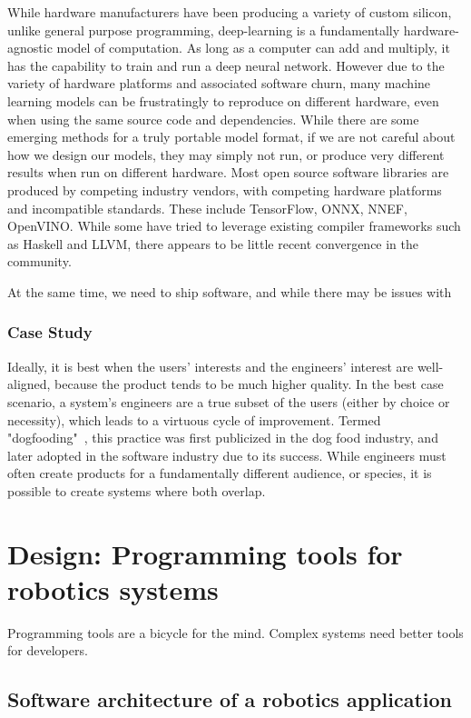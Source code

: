 \documentclass[12pt,initial,twoside,maitrise]{dms}
\numberwithin{equation}{section}
\numberwithin{table}{chapter}
\numberwithin{figure}{chapter}
\begin{document}
While hardware manufacturers have been producing a variety of custom silicon, unlike general purpose programming, deep-learning is a fundamentally hardware-agnostic model of computation. As long as a computer can add and multiply, it has the capability to train and run a deep neural network. However due to the variety of hardware platforms and associated software churn, many machine learning models can be frustratingly to reproduce on different hardware, even when using the same source code and dependencies. While there are some emerging methods for a truly portable model format, if we are not careful about how we design our models, they may simply not run, or produce very different results when run on different hardware. Most open source software libraries are produced by competing industry vendors, with competing hardware platforms and incompatible standards. These include TensorFlow, ONNX, NNEF, OpenVINO. While some have tried to leverage existing compiler frameworks such as Haskell and LLVM, there appears to be little recent convergence in the community.

At the same time, we need to ship software, and while there may be issues with

\subsection{Case Study}\label{subsec:case-study}

Ideally, it is best when the users' interests and the engineers' interest are well-aligned, because the product tends to be much higher quality. In the best case scenario, a system's engineers are a true subset of the users (either by choice or necessity), which leads to a virtuous cycle of improvement. Termed "dogfooding"~\cite{harrison2006eating}, this practice was first publicized in the dog food industry, and later adopted in the software industry due to its success. While engineers must often create products for a fundamentally different audience, or species, it is possible to create systems where both overlap.

\chapter{Design: Programming tools for robotics systems}\label{ch:hatchery}

Programming tools are a bicycle for the mind. Complex systems need better tools for developers.

\section{Software architecture of a robotics application}
\end{document}
